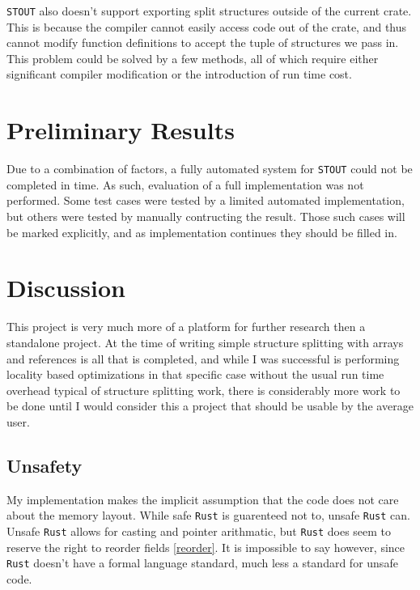 \documentclass[prodmode,acmtecs]{acmsmall} %
\newcommand{\rustname}{{\texttt{Rust}}}
\def \rust {\rustname{}\xspace}
\newcommand{\llvmname}{{\texttt{LLVM}}}
\def \llvm {\llvmname{}\xspace}
\newcommand{\projectname}{{\texttt{STOUT}}}
\def \name{\projectname\xspace}
\begin{document}
\name also doesn't support exporting split structures outside of the 
current crate.
This is because the compiler cannot easily access code out of the crate, and
thus cannot modify function definitions to accept the tuple of structures we
pass in. This problem could be solved by a few methods, all of which require
either significant compiler modification or the introduction of run
time cost. 

\section{Preliminary Results}
Due to a combination of factors, a fully automated system for \name could not
be completed in time. As such, evaluation of a full implementation
was not performed. Some test cases were tested by a limited automated implementation,
but others were tested by manually contructing the result. Those such cases
will be marked explicitly, and as implementation continues they should be filled in.



\section{Discussion}
\label{sec:discuss}

This project is very much more of a platform for further research then a
standalone project. At the time of writing simple structure splitting
with arrays and references is all that is completed, and 
while I was successful is performing locality based
optimizations in that specific case without the usual 
run time overhead typical of structure splitting
work, there is considerably more work to be done until I 
would consider this
a project that should be usable by the average user.

\todo[inline]{Maybe talk about why not \llvm }

\subsection{Unsafety}
\label{sec:unsafe}

My implementation makes the implicit assumption that the code
does not care about the memory layout. While safe 
\rust is guarenteed not to, unsafe \rust can. Unsafe \rust
allows for casting and pointer arithmatic, but \rust
does seem to reserve the right to reorder fields \ref{reorder}.
It is impossible to say however, since \rust doesn't have a
formal language standard, much less a standard for unsafe code.
\end{document}
